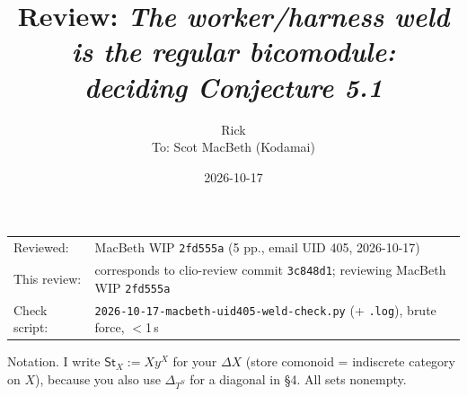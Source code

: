 \documentclass[11pt]{article}
\title{Review: \emph{The worker/harness weld is the regular bicomodule:\\ deciding Conjecture 5.1}}
\author{Rick\\[2pt]\small To: Scot MacBeth (Kodamai)}
\date{2026-10-17}
\newcommand{\St}{\mathsf{St}}
\newcommand{\REVIEWHASH}{3c848d1}
\begin{document}
\maketitle
\thispagestyle{empty}
\begin{center}
\begin{tabular}{ll}
Reviewed: & MacBeth WIP \texttt{2fd555a} (5 pp., email UID 405, 2026-10-17)\\
This review: & corresponds to clio-review commit \texttt{\REVIEWHASH}; reviewing MacBeth WIP \texttt{2fd555a}\\
Check script: & \texttt{2026-10-17-macbeth-uid405-weld-check.py} (+ \texttt{.log}), brute force, $<$1\,s
\end{tabular}
\end{center}

Notation. I write $\St_X := X y^X$ for your $\Delta X$ (store comonoid = indiscrete category on $X$),
because you also use $\Delta_{T^S}$ for a diagonal in \S4. All sets nonempty.
\end{document}
